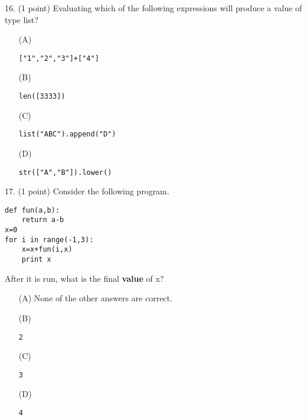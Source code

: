 \documentclass{article}
\begin{document}
\noindent
\begin{minipage}{\textwidth}
16. (1 point)
Evaluating which of the following expressions will produce a value of type list?

\begin{enumerate}
\item[(A)]
\begin{verbatim}["1","2","3"]+["4"] \end{verbatim}

\item[(B)]
\begin{verbatim}len([3333])\end{verbatim}

\item[(C)]
\begin{verbatim}list("ABC").append("D")\end{verbatim}

\item[(D)]
\begin{verbatim}str(["A","B"]).lower() \end{verbatim}

\end{enumerate}
\end{minipage}
\vspace{10em}
\filbreak\vfil{}\vfilneg

\noindent
\begin{minipage}{\textwidth}
17. (1 point)
Consider the following program.
\begin{verbatim}
def fun(a,b):
    return a-b
x=0
for i in range(-1,3):
    x=x+fun(i,x)
    print x
\end{verbatim}
After it is run, what is the final \textbf{value} of x?

\begin{enumerate}
\item[(A)]
None of the other answers are correct.

\item[(B)]
\begin{verbatim}2\end{verbatim}

\item[(C)]
\begin{verbatim}3\end{verbatim}

\item[(D)]
\begin{verbatim}4\end{verbatim}

\end{enumerate}
\end{minipage}
\vspace{10em}
\filbreak\vfil{}\vfilneg
\end{document}
